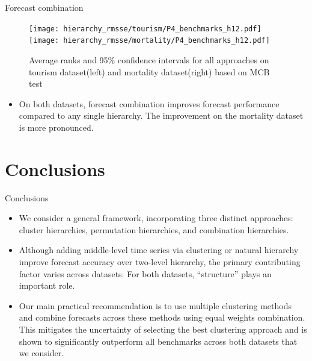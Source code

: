 \documentclass[aspectratio=169]{beamer}
\begin{document}
\begin{frame}{Forecast combination}
	\begin{figure}
	\centering
	\texttt{[image: hierarchy\_rmsse/tourism/P4\_benchmarks\_h12.pdf]}
	\texttt{[image: hierarchy\_rmsse/mortality/P4\_benchmarks\_h12.pdf]}
	\caption{Average ranks and 95\% confidence intervals for all approaches on tourism dataset(left) and mortality dataset(right) based on MCB test}
	\end{figure}
	\begin{itemize}
		\item On both datasets, forecast combination improves forecast performance compared to any single hierarchy. The improvement on the mortality dataset is more pronounced.
	\end{itemize}
\end{frame}

\section{Conclusions}

\begin{frame}{Conclusions}
	\begin{itemize}
		\item We consider a general framework, incorporating three distinct approaches: cluster hierarchies, permutation hierarchies, and combination hierarchies.
		\item Although adding middle-level time series via clustering or natural hierarchy improve forecast accuracy over two-level hierarchy, {\color{red}the primary contributing factor varies across datasets}. For both datasets, ``structure'' plays an important role.
		\item Our main practical recommendation is to {\color{red}use multiple clustering methods and combine forecasts across these methods using equal weights combination}. This mitigates the uncertainty of selecting the best clustering approach and is shown to significantly outperform all benchmarks across both datasets that we consider.
	\end{itemize}
\end{frame}
\end{document}

